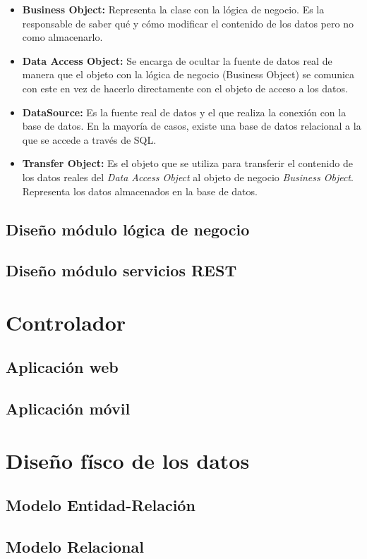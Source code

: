\begin{itemize}
	\item \textbf{Business Object: } Representa la clase con la lógica de negocio. Es la responsable de saber qué y cómo modificar el contenido de los datos pero no como almacenarlo.
	\item \textbf{Data Access Object: } Se encarga de ocultar la fuente de datos real de manera que el objeto con la lógica de negocio (Business Object) se comunica con este en vez de hacerlo directamente con el objeto de acceso a los datos.
	\item \textbf{DataSource: } Es la fuente real de datos y el que realiza la conexión con la base de datos. En la mayoría de casos, existe una base de datos relacional a la que se accede a través de SQL.
	\item \textbf{Transfer Object: } Es el objeto que se utiliza para transferir el contenido de los datos reales del \textit{Data Access Object} al objeto de negocio \textit{Business Object}. Representa los datos almacenados en la base de datos.
\end{itemize}

\subsection{Diseño módulo lógica de negocio}
\subsection{Diseño módulo servicios REST}
\section{Controlador}
\subsection{Aplicación web}
\subsection{Aplicación móvil}

\section{Diseño físco de los datos}
\subsection{Modelo Entidad-Relación}
\subsection{Modelo Relacional}






